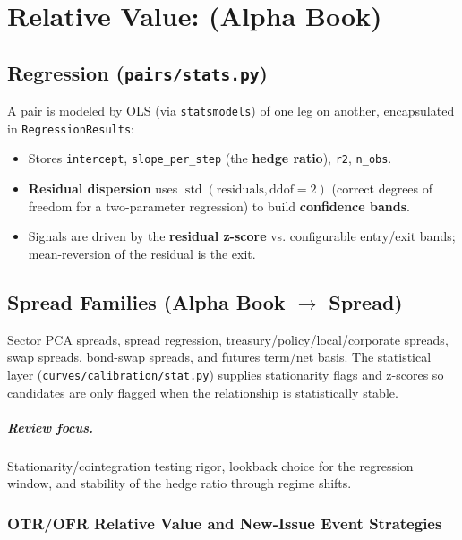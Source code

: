\chapter{Relative Value: (Alpha Book)}

\section{Regression (\texttt{pairs/stats.py})}

A pair is modeled by OLS (via \texttt{statsmodels}) of one leg on another, encapsulated in
\texttt{RegressionResults}:

\begin{itemize}
\item Stores \texttt{intercept}, \texttt{slope\_per\_step} (the \textbf{hedge ratio}), \texttt{r2}, \texttt{n\_obs}.
\item \textbf{Residual dispersion} uses $\operatorname{std}(\text{residuals}, \mathrm{ddof}=2)$ (correct degrees of freedom for a two-parameter regression) to build \textbf{confidence bands}.
\item Signals are driven by the \textbf{residual z-score} vs. configurable entry/exit bands; mean-reversion of the residual is the exit.
\end{itemize}

\section{Spread Families (Alpha Book $\rightarrow$ Spread)}

Sector PCA spreads, spread regression, treasury/policy/local/corporate spreads, swap
spreads, bond-swap spreads, and futures term/net basis. The statistical layer
(\texttt{curves/calibration/stat.py}) supplies stationarity flags and z-scores so candidates
are only flagged when the relationship is statistically stable.

\paragraph{Review focus.}
Stationarity/cointegration testing rigor, lookback choice for the regression window,
and stability of the hedge ratio through regime shifts.

\subsection{OTR/OFR Relative Value and New-Issue Event Strategies}
\label{sec:pairs-tbondcurve-otr-ofr}

